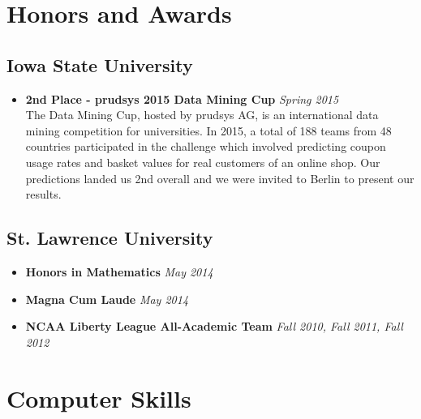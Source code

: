 \documentclass[11pt,a4paper,sans]{moderncv}        %
\begin{document}
\section{Honors and Awards}

\vspace{6pt}

\subsection{Iowa State University}

\begin{itemize}
  \item \textbf{2nd Place - prudsys 2015 Data Mining Cup} \hfill \emph{Spring 2015} \\ 
    The Data Mining Cup, hosted by prudsys AG, is an international data
    mining competition for universities. In 2015, a total of 188 teams from 48
    countries participated in the challenge which involved predicting coupon
    usage rates and basket values for real customers of an online shop. Our
    predictions landed us 2nd overall and we were invited to Berlin to
    present our results.
\end{itemize}

\vspace{6pt}

\subsection{St. Lawrence University}

\begin{itemize}
  \item \textbf{Honors in Mathematics} \hfill \emph{May 2014}

    \vspace{6pt}

  \item \textbf{Magna Cum Laude} \hfill \emph{May 2014}

    \vspace{6pt}

  \item \textbf{NCAA Liberty League All-Academic Team} \hfill \emph{Fall 2010, Fall 2011, Fall 2012}

\end{itemize}

\section{Computer Skills}
\end{document}
